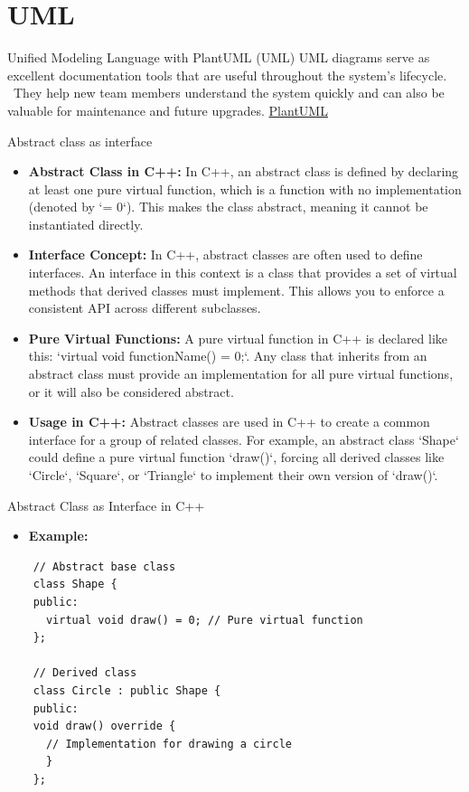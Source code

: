 \documentclass[10pt]{beamer}
\begin{document}
\section{UML}
\begin{frame} {Unified Modeling Language with PlantUML (UML)}
  UML diagrams serve as excellent documentation tools that are useful throughout the system's lifecycle. \
  They help new team members understand the system quickly and can also be valuable for maintenance and future upgrades.
  \href{https://plantuml.com/}{PlantUML}
\end{frame}

\begin{frame} {Abstract class as interface}
  \begin{itemize}
    \item \textbf{Abstract Class in C++:} In C++, an abstract class is defined by declaring at least one pure virtual function, which is a function with no implementation (denoted by `= 0`). This makes the class abstract, meaning it cannot be instantiated directly.
    
    \item \textbf{Interface Concept:} In C++, abstract classes are often used to define interfaces. An interface in this context is a class that provides a set of virtual methods that derived classes must implement. This allows you to enforce a consistent API across different subclasses.
    
    \item \textbf{Pure Virtual Functions:} A pure virtual function in C++ is declared like this: `virtual void functionName() = 0;`. Any class that inherits from an abstract class must provide an implementation for all pure virtual functions, or it will also be considered abstract.
    
    \item \textbf{Usage in C++:} Abstract classes are used in C++ to create a common interface for a group of related classes. For example, an abstract class `Shape` could define a pure virtual function `draw()`, forcing all derived classes like `Circle`, `Square`, or `Triangle` to implement their own version of `draw()`.

  \end{itemize}
\end{frame}

\begin{frame}[fragile]{Abstract Class as Interface in C++}
  \begin{itemize}
      \item \textbf{Example:}
  \end{itemize}
  \begin{lstlisting}
    // Abstract base class
    class Shape {
    public:
      virtual void draw() = 0; // Pure virtual function
    };

    // Derived class
    class Circle : public Shape {
    public:
    void draw() override {
      // Implementation for drawing a circle
      }
    };
  \end{lstlisting}
\end{frame}
\end{document}
